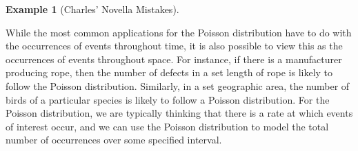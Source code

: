 \documentclass[
  letterpaper,
  DIV=11,
  numbers=noendperiod]{scrreprt}
\theoremstyle{definition}
\theoremstyle{definition}
\newtheorem{example}{Example}[chapter]
\theoremstyle{definition}
\theoremstyle{remark}
\begin{document}
\begin{example}[Charles' Novella
Mistakes]
\begin{tcolorbox}[enhanced jigsaw, colback=white, colframe=quarto-callout-color-frame, arc=.35mm, leftrule=.75mm, rightrule=.15mm, opacityback=0, breakable, bottomrule=.15mm, left=2mm, toprule=.15mm]
\end{tcolorbox}

\end{example}

While the most common applications for the Poisson distribution have to
do with the occurrences of events throughout time, it is also possible
to view this as the occurrences of events throughout space. For
instance, if there is a manufacturer producing rope, then the number of
defects in a set length of rope is likely to follow the Poisson
distribution. Similarly, in a set geographic area, the number of birds
of a particular species is likely to follow a Poisson distribution. For
the Poisson distribution, we are typically thinking that there is a rate
at which events of interest occur, and we can use the Poisson
distribution to model the total number of occurrences over some
specified interval.
\end{document}
